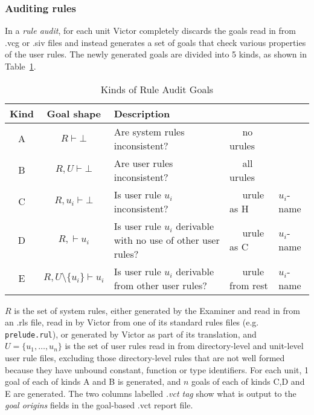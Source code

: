 \documentclass[12pt,fleqn]{article}
\begin{document}
\subsubsection{Auditing rules}

In a \emph{rule audit}, for each unit Victor completely discards the
goals read in from .vcg or .siv files and instead generates a set of goals
that check various properties of the user rules.  
%
The newly generated goals are divided into 5 kinds, as shown in
Table~{\ref{tab:audit-goal-kinds}}.
\begin{table}[htb]
  \newcommand{\uiname}{$u_i$-name}
  \centering
  \begin{tabular}{ccp{6cm}>{\ttfamily\ \ }ll}
    Kind   &    Goal shape  &  Description  &  \multicolumn{2}{c}{.vct tag} \\
    \hline
    A      &  $R \vdash \bot$ 
                      &  Are system rules inconsistent?
                                      & \ttfamily no urules  \\
    B      &  $R, U \vdash \bot$
                      &  Are user rules inconsistent?
                                      & all urules  \\
    C      &  $R, u_i \vdash \bot$
                      &  Is user rule $u_i$ inconsistent?
                                      & urule as H     & \uiname \\
    D      &  $R, \vdash u_i$
                      &  Is user rule $u_i$ derivable with no use of
                         other user rules?
                                      & urule as C   & \uiname \\
    E      &  $R, U\setminus\{u_i\} \vdash u_i$
                      &  Is user rule $u_i$ derivable from 
                         other user rules?
                         & urule from rest   & \uiname\\
  \hline
  \end{tabular}
  \caption{Kinds of Rule Audit Goals}
  \label{tab:audit-goal-kinds}
\end{table}

$R$ is the set of system rules, either generated by the Examiner
and read in from an .rls file, read in by Victor from one of its
standard rules files (e.g. \texttt{prelude.rul}), or generated by
Victor as part of its translation, 
%
and $U = \{u_1, \ldots, u_n\}$ is the set of user rules read in from
directory-level and unit-level user rule files, excluding those directory-level
rules that are not well formed because they have unbound constant, function or type identifiers.
%
For each unit, 1 goal of each of kinds A and B is generated, and $n$
goals of each of kinds C,D and E are generated.
%
The two columns labelled \emph{.vct tag} show what is output to the
\emph{goal origins} fields in the goal-based .vct report file.
\end{document}
